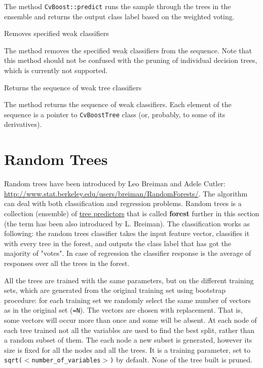 The method \texttt{CvBoost::predict} runs the sample through the trees in the ensemble and returns the output class label based on the weighted voting.



Removes specified weak classifiers


The method removes the specified weak classifiers from the sequence. Note that this method should not be confused with the pruning of individual decision trees, which is currently not supported.



Returns the sequence of weak tree classifiers


The method returns the sequence of weak classifiers. Each element of the sequence is a pointer to \texttt{CvBoostTree} class (or, probably, to some of its derivatives).

\section{Random Trees}


Random trees have been introduced by Leo Breiman and Adele Cutler: \url{http://www.stat.berkeley.edu/users/breiman/RandomForests/}. The algorithm can deal with both classification and regression problems. Random trees is a collection (ensemble) of \href{#DecisionTrees}{tree predictors} that is called \textbf{forest} further in this section (the term has been also introduced by L. Breiman). The classification works as following: the random trees classifier takes the input feature vector, classifies it with every tree in the forest, and outputs the class label that has got the majority of "votes". In case of regression the classifier response is the average of responses over all the trees in the forest.

All the trees are trained with the same parameters, but on the different training sets, which are generated from the original training set using bootstrap procedure: for each training set we randomly select the same number of vectors as in the original set (\texttt{=N}). The vectors are chosen with replacement. That is, some vectors will occur more than once and some will be absent. At each node of each tree trained not all the variables are used to find the best split, rather than a random subset of them. The each node a new subset is generated, however its size is fixed for all the nodes and all the trees. It is a training parameter, set to \texttt{sqrt($<$number\_of\_variables$>$)} by default. None of the tree built is pruned.

